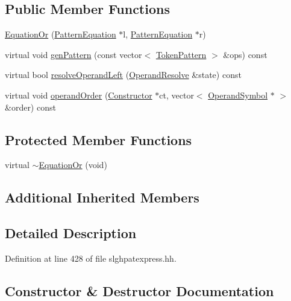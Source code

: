 \subsection*{Public Member Functions}
\begin{DoxyCompactItemize}
\item 
\mbox{\hyperlink{class_equation_or_a43ae367817d4f9bbab54862b666e7b8b}{Equation\+Or}} (\mbox{\hyperlink{class_pattern_equation}{Pattern\+Equation}} $\ast$l, \mbox{\hyperlink{class_pattern_equation}{Pattern\+Equation}} $\ast$r)
\item 
virtual void \mbox{\hyperlink{class_equation_or_a6fe7cf006e7c2f0861ee6cce846f9feb}{gen\+Pattern}} (const vector$<$ \mbox{\hyperlink{class_token_pattern}{Token\+Pattern}} $>$ \&ops) const
\item 
virtual bool \mbox{\hyperlink{class_equation_or_adcdf8650d37644bf0e43a9a0c38ddd7c}{resolve\+Operand\+Left}} (\mbox{\hyperlink{struct_operand_resolve}{Operand\+Resolve}} \&state) const
\item 
virtual void \mbox{\hyperlink{class_equation_or_a03a072384883e49f46825d1227872189}{operand\+Order}} (\mbox{\hyperlink{class_constructor}{Constructor}} $\ast$ct, vector$<$ \mbox{\hyperlink{class_operand_symbol}{Operand\+Symbol}} $\ast$ $>$ \&order) const
\end{DoxyCompactItemize}
\subsection*{Protected Member Functions}
\begin{DoxyCompactItemize}
\item 
virtual \mbox{\hyperlink{class_equation_or_a14f865b76017432fafb982b51985c6c6}{$\sim$\+Equation\+Or}} (void)
\end{DoxyCompactItemize}
\subsection*{Additional Inherited Members}


\subsection{Detailed Description}


Definition at line 428 of file slghpatexpress.\+hh.



\subsection{Constructor \& Destructor Documentation}
\mbox{\label{class_equation_or_a14f865b76017432fafb982b51985c6c6}} 
